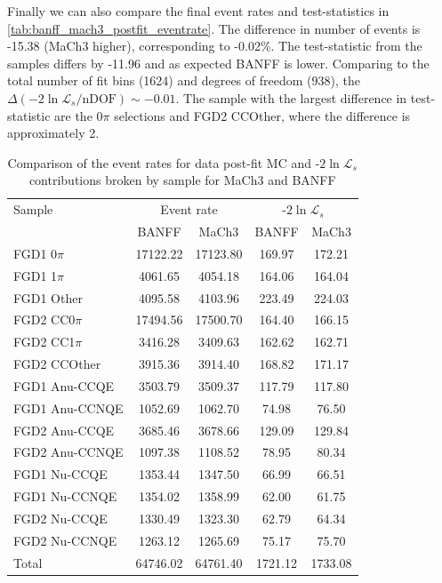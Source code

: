 Finally we can also compare the final event rates and test-statistics in \autoref{tab:banff_mach3_postfit_eventrate}. The difference in number of events is -15.38 (MaCh3 higher), corresponding to -0.02\%. The test-statistic from the samples differs by -11.96 and as expected BANFF is lower. Comparing to the total number of fit bins (1624) and degrees of freedom (938), the $\Delta\left(-2\ln\mathcal{L}_s/\text{nDOF}\right) \sim -0.01$. The sample with the largest difference in test-statistic are the 0$\pi$ selections and FGD2 CCOther, where the difference is approximately 2.
\begin{table}[h]
	\centering 
		\begin{tabular}{ l | c c | c c }
			\hline
			\hline
                        Sample 		& \multicolumn{2}{c|}{Event rate} & \multicolumn{2}{c}{-$2\ln{\mathcal{L}}_{s}$} \\
                                        & BANFF         & MaCh3    & BANFF    & MaCh3 \\
                        \hline
			FGD1 0$\pi$ 	& 17122.22 	& 17123.80 & 169.97   & 172.21 	\\ 
			FGD1 1$\pi$ 	& 4061.65 	& 4054.18  & 164.06   & 164.04 	\\ 
			FGD1 Other 	& 4095.58 	& 4103.96  & 223.49   & 224.03 	\\ 
                        \hline
			FGD2 CC0$\pi$ 	& 17494.56 	& 17500.70 & 164.40   & 166.15 	\\ 
			FGD2 CC1$\pi$ 	& 3416.28 	& 3409.63  & 162.62   & 162.71 	\\ 
			FGD2 CCOther 	& 3915.36 	& 3914.40  & 168.82   & 171.17 	\\ 
                        \hline
			FGD1 Anu-CCQE 	& 3503.79 	& 3509.37  & 117.79   & 117.80 	\\ 
			FGD1 Anu-CCNQE 	& 1052.69 	& 1062.70  & 74.98    & 76.50 	\\ 
			FGD2 Anu-CCQE 	& 3685.46  	& 3678.66  & 129.09   & 129.84 	\\ 
			FGD2 Anu-CCNQE 	& 1097.38	& 1108.52  & 78.95    & 80.34 	\\ 
                        \hline
			FGD1 Nu-CCQE 	& 1353.44 	& 1347.50  & 66.99    & 66.51 	\\ 
			FGD1 Nu-CCNQE 	& 1354.02 	& 1358.99  & 62.00    & 61.75 	\\ 
			FGD2 Nu-CCQE 	& 1330.49 	& 1323.30  & 62.79    & 64.34 	\\ 
			FGD2 Nu-CCNQE 	& 1263.12 	& 1265.69  & 75.17    & 75.70 	\\ 
			\hline
			Total 		& 64746.02      & 64761.40 & 1721.12  & 1733.08 	\\ 
                        \hline
                        \hline
		\end{tabular}
	\caption{Comparison of the event rates for data post-fit MC and -$2\ln{\mathcal{L}}_{s}$ contributions broken by sample for MaCh3 and BANFF}
	\label{tab:banff_mach3_postfit_eventrate}
\end{table}

